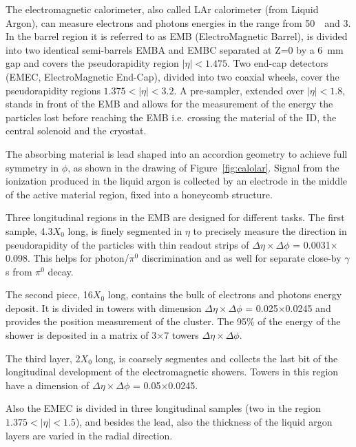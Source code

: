 The electromagnetic calorimeter, also called LAr calorimeter (from Liquid Argon),
can measure electrons and photons energies in the range from 50~\mev\ and 3\tev.
In the barrel region it is referred to as EMB (ElectroMagnetic Barrel), is 
divided into two identical semi-barrels EMBA and EMBC separated at Z=0 by a 6~mm
gap and covers the pseudorapidity region $|\eta|<1.475$. 
Two end-cap detectors (EMEC, ElectroMagnetic End-Cap), divided 
into two coaxial wheels, cover the pseudorapidity 
regions $1.375<|\eta|<3.2$. A pre-sampler, extended over 
$|\eta|<1.8$, stands in front of the EMB and allows for the measurement of
the energy the particles lost before reaching the EMB i.e. crossing the
material of the ID, the central solenoid and the cryostat.

The absorbing material is lead shaped into an accordion geometry to achieve
full symmetry in $\phi$, as shown in the drawing of Figure~\ref{fig:calolar}.
Signal from the ionization produced in the liquid argon is collected
by an electrode in the middle of the active material region, fixed into
a honeycomb structure.

Three longitudinal regions in the EMB are designed for different tasks. The first
sample, 4.3$X_0$ long, is finely segmented in $\eta$ to precisely measure
the direction in pseudorapidity of the particles with  thin readout strips
of $\Delta\eta\times\Delta\phi$ = 0.0031$\times$0.098. This helps for
photon/$\pi^{0}$ discrimination and as well for separate close-by $\gamma$s
from $\pi^{0}$ decay.

The second piece, 16$X_0$ long, contains the bulk of electrons and photons energy deposit. 
It is divided in towers with dimension $\Delta\eta\times\Delta\phi$ = 0.025$\times$0.0245
and provides the position measurement of the cluster. 
The  95\% of the energy of the shower is deposited in a matrix of 3$\times$7 
towers $\Delta\eta\times\Delta\phi$.

The third layer, 2$X_0$ long, is coarsely segmentes and collects the last bit of the longitudinal
development of the electromagnetic showers. Towers in this region have a dimension
of $\Delta\eta\times\Delta\phi$ = 0.05$\times$0.0245.

Also the EMEC is divided in three longitudinal samples (two in the region $1.375<|\eta|<1.5$),
and besides the lead, also the thickness of the liquid argon layers are varied in the
radial direction.

